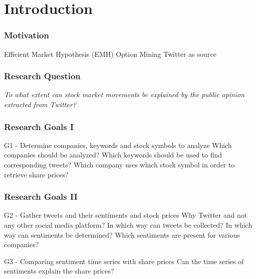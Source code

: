 
\section{Introduction}
 
\begin{frame}
    \frametitle{Motivation}
    
    \begin{outline}
        \1 Efficient Market Hypothesis (EMH)
        \1 Option Mining
        \1 Twitter as source
    \end{outline}
\end{frame}


\begin{frame}
    \frametitle{Research Question}

    \emph{
    To what extent can stock market movements be explained by the public opinion extracted from Twitter?
    }
\end{frame}

\begin{frame}
    \frametitle{Research Goals I}
    
    \begin{outline}
        \1 G1 - Determine companies, keywords and stock symbols to analyze
            \2 Which companies should be analyzed?
            \2 Which keywords should be used to find corresponding tweets?
            \2 Which company uses which stock symbol in order to retrieve share prices?
    \end{outline}
\end{frame}

\begin{frame}
    \frametitle{Research Goals II}

    \begin{outline}

    \1 G2 - Gather tweets and their sentiments and stock prices
        \2 Why Twitter and not any other social media platform?
        \2 In which way can tweets be collected?
        \2 In which way can sentiments be determined?
        \2 Which sentiments are present for various companies?

    \1 G3 - Comparing sentiment time series with share prices
        \2 Can the time series of sentiments explain the share prices?

    \end{outline}
\end{frame}